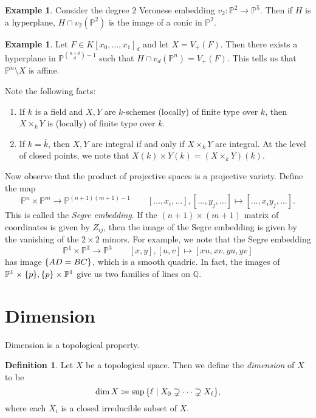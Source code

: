 \documentclass[leqno, openany]{memoir}
\theoremstyle{definition}
\newtheorem{defn}[thm]{Definition}
\newtheorem{exm}[thm]{Example}
\theoremstyle{remark}
\theoremstyle{plain}
\theoremstyle{definition}
\theoremstyle{remark}
\newcommand{\Q}{\mathbb{Q}}
\renewcommand{\P}{\mathbb{P}}
\newcommand{\ol}[1]{\overline{#1}}
\begin{document}
\begin{exm}
    Consider the degree $2$ Veronese embedding $v_2 \colon \P^2 \to \P^5$. Then if $H$ is a hyperplane, $H \cap v_2(\P^2)$ is the image of a conic in $\P^2$.
\end{exm}

\begin{exm}
    Let $F \in {K[x_0, \ldots, x_1]}_d$ and let $X = V_+(F)$. Then there exists a hyperplane in $\P^{\binom{n+d}{d}-1}$ such that $H \cap v_d(\P^n) = V_+(F)$. This tells us that $\P^n \setminus X$ is affine.
\end{exm}

Note the following facts:
\begin{enumerate}
    \item If $k$ is a field and $X,Y$ are $k$-schemes (locally) of finite type over $k$, then $X \times_k Y$ is (locally) of finite type over $k$.
    \item If $k = \ol{k}$, then $X,Y$ are integral if and only if $X \times_k Y$ are integral. At the level of closed points, we note that $X(k) \times Y(k) = (X \times_k Y)(k)$.
\end{enumerate}

Now observe that the product of projective spaces is a projective variety. Define the map
\[ \P^n \times \P^m \to \P^{(n+1)(m+1)-1} \qquad [\ldots, x_i,\ldots], [\ldots, y_j, \ldots] \mapsto [\ldots, x_i y_j, \ldots]. \]
This is called the \textit{Segre embedding}. If the $(n+1) \times (m+1)$ matrix of coordinates is given by $Z_{ij}$, then the image of the Segre embedding is given by the vanishing of the $2 \times 2$ minors. For example, we note that the Segre embedding
\[ \P^1 \times \P^3 \to \P^3 \qquad [x,y], [u,v] \mapsto [xu,xv,yu,yv] \]
has image $\qty{AD = BC}$, which is a smooth quadric. In fact, the images of $\P^1 \times \qty{p}, \qty{p} \times \P^1$ give us two families of lines on $\Q$.

\section{Dimension}%
\label{sec:dimension}

Dimension is a topological property. 

\begin{defn}
    Let $X$ be a topological space. Then we define the \textit{dimension} of $X$ to be
    \[ \dim X \coloneqq \sup \qty{\ell \mid X_0 \supsetneq \cdots \supsetneq X_{\ell}}, \]
    where each $X_i$ is a closed irreducible subset of $X$.
\end{defn}
\end{document}
